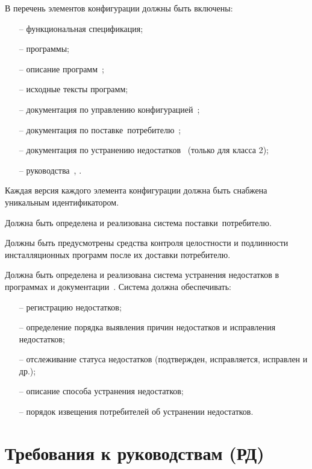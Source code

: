 \label{CMList}
В перечень элементов конфигурации должны быть включены:
\begin{itemize}
\item[--]
функциональная спецификация;
\item[--]
программы;
\item[--]
описание программ~;
\item[--]
исходные тексты программ;
\item[--]
документация по управлению конфигурацией~;
\item[--]
документация по поставке~\TOE потребителю~;
\item[--]
документация по устранению недостатков~
(только для класса 2);
\item[--]
руководства~, .
\end{itemize}

\label{CMVersion}
Каждая версия каждого элемента конфигурации 
должна быть снабжена уникальным идентификатором. 

\label{Delivery}
Должна быть определена и реализована система поставки~\TOE потребителю.  

\label{Authenticode}
Должны быть предусмотрены средства контроля целостности и подлинности 
инсталляционных программ после их доставки потребителю. 

\label{FlawRemediation}
Должна быть определена и реализована система устранения недостатков 
в программах и документации~\TOE.
Система должна обеспечивать:
\begin{itemize}
\item[--]
регистрацию недостатков;
\item[--]
определение порядка выявления причин недостатков
и исправления недостатков;
\item[--]
отслеживание статуса недостатков 
(подтвержден, исправляется, исправлен и др.);
\item[--]
описание способа устранения недостатков;
\item[--]
порядок извещения потребителей об устранении недостатков.
\end{itemize}

\section{Требования к руководствам (РД)}

